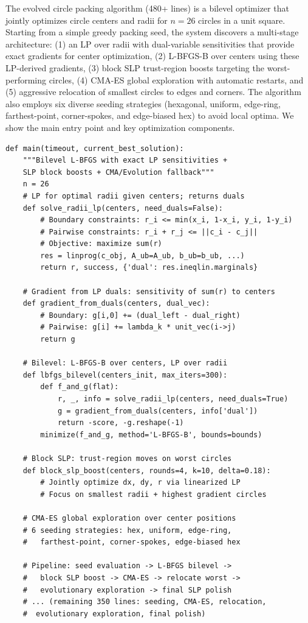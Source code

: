 \documentclass[sigconf,anonymous,review]{acmart}
\begin{document}
The evolved circle packing algorithm (480+ lines) is a bilevel optimizer that jointly optimizes circle centers and radii for $n{=}26$ circles in a unit square. Starting from a simple greedy packing seed, the system discovers a multi-stage architecture: (1) an LP over radii with dual-variable sensitivities that provide exact gradients for center optimization, (2) L-BFGS-B over centers using these LP-derived gradients, (3) block SLP trust-region boosts targeting the worst-performing circles, (4) CMA-ES global exploration with automatic restarts, and (5) aggressive relocation of smallest circles to edges and corners. The algorithm also employs six diverse seeding strategies (hexagonal, uniform, edge-ring, farthest-point, corner-spokes, and edge-biased hex) to avoid local optima. We show the main entry point and key optimization components.

\begin{promptbox}
\begin{lstlisting}[aboveskip=0pt,belowskip=0pt,numbers=none,frame=none,backgroundcolor=\color{gray!5}]
def main(timeout, current_best_solution):
    """Bilevel L-BFGS with exact LP sensitivities +
    SLP block boosts + CMA/Evolution fallback"""
    n = 26
    # LP for optimal radii given centers; returns duals
    def solve_radii_lp(centers, need_duals=False):
        # Boundary constraints: r_i <= min(x_i, 1-x_i, y_i, 1-y_i)
        # Pairwise constraints: r_i + r_j <= ||c_i - c_j||
        # Objective: maximize sum(r)
        res = linprog(c_obj, A_ub=A_ub, b_ub=b_ub, ...)
        return r, success, {'dual': res.ineqlin.marginals}

    # Gradient from LP duals: sensitivity of sum(r) to centers
    def gradient_from_duals(centers, dual_vec):
        # Boundary: g[i,0] += (dual_left - dual_right)
        # Pairwise: g[i] += lambda_k * unit_vec(i->j)
        return g

    # Bilevel: L-BFGS-B over centers, LP over radii
    def lbfgs_bilevel(centers_init, max_iters=300):
        def f_and_g(flat):
            r, _, info = solve_radii_lp(centers, need_duals=True)
            g = gradient_from_duals(centers, info['dual'])
            return -score, -g.reshape(-1)
        minimize(f_and_g, method='L-BFGS-B', bounds=bounds)

    # Block SLP: trust-region moves on worst circles
    def block_slp_boost(centers, rounds=4, k=10, delta=0.18):
        # Jointly optimize dx, dy, r via linearized LP
        # Focus on smallest radii + highest gradient circles

    # CMA-ES global exploration over center positions
    # 6 seeding strategies: hex, uniform, edge-ring,
    #   farthest-point, corner-spokes, edge-biased hex

    # Pipeline: seed evaluation -> L-BFGS bilevel ->
    #   block SLP boost -> CMA-ES -> relocate worst ->
    #   evolutionary exploration -> final SLP polish
    # ... (remaining 350 lines: seeding, CMA-ES, relocation,
    #  evolutionary exploration, final polish)
\end{lstlisting}
\end{promptbox}
\end{document}
